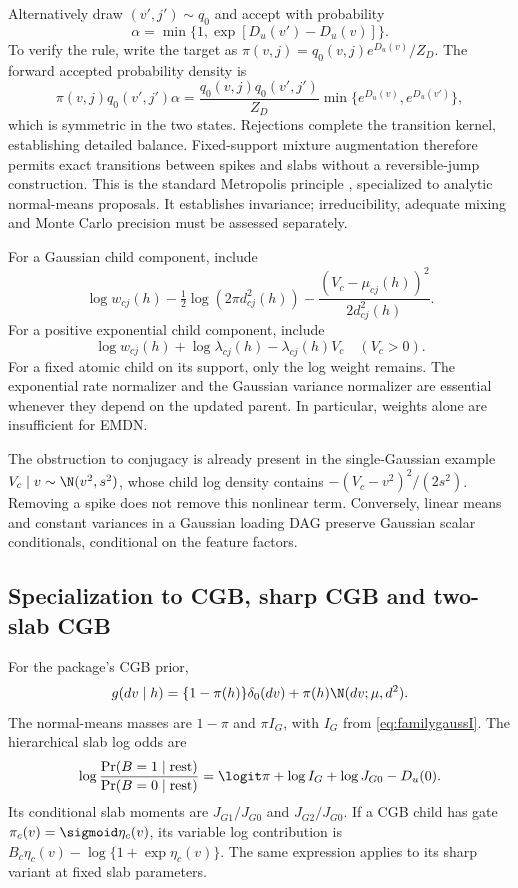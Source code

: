 Alternatively draw \((v',j')\sim q_0\) and accept with probability
\begin{equation}\label{eq:familyMH}
\alpha=\min\{1,\exp[D_u(v')-D_u(v)]\}.
\end{equation}
To verify the rule, write the target as
\(\pi(v,j)=q_0(v,j)e^{D_u(v)}/Z_D\).
The forward accepted probability density is
\[
\pi(v,j)q_0(v',j')\alpha
=\frac{q_0(v,j)q_0(v',j')}{Z_D}
 \min\{e^{D_u(v)},e^{D_u(v')}\},
\]
which is symmetric in the two states. Rejections complete the transition
kernel, establishing detailed balance. Fixed-support mixture augmentation
therefore permits exact transitions between spikes and slabs without a
reversible-jump construction. This is the standard Metropolis principle
\cite{hastings}, specialized to analytic normal-means proposals.
It establishes invariance; irreducibility, adequate mixing and Monte Carlo
precision must be assessed separately.

For a Gaussian child component, include
\[
\log w_{cj}(h)-\tfrac12\log(2\pi d_{cj}^2(h))
-\frac{(V_c-\mu_{cj}(h))^2}{2d_{cj}^2(h)}.
\]
For a positive exponential child component, include
\begin{equation}\label{eq:expchild}
\log w_{cj}(h)+\log\lambda_{cj}(h)-\lambda_{cj}(h)V_c
\quad(V_c>0).
\end{equation}
For a fixed atomic child on its support, only the log weight remains.
The exponential rate normalizer and the Gaussian variance normalizer are
essential whenever they depend on the updated parent. In particular,
weights alone are insufficient for EMDN.

The obstruction to conjugacy is already present in the single-Gaussian
example \(V_c\mid v\sim\N(v^2,s^2)\), whose child log density contains
\(-(V_c-v^2)^2/(2s^2)\). Removing a spike does not remove this nonlinear
term. Conversely, linear means and constant variances in a Gaussian
loading DAG preserve Gaussian scalar conditionals, conditional on the
feature factors.

\subsection{Specialization to CGB, sharp CGB and two-slab CGB}
\label{sec:familycgb}
For the package's CGB prior,
\[
g(dv\mid h)=\{1-\pi(h)\}\delta_0(dv)
                +\pi(h)\N(dv;\mu,d^2).
\]
The normal-means masses are \(1-\pi\) and \(\pi I_G\), with
\(I_G\) from \eqref{eq:familygaussI}. The hierarchical slab log odds are
\begin{equation}\label{eq:cgbfamilyodds}
\log\frac{\Pr(B=1\mid\mathrm{rest})}{\Pr(B=0\mid\mathrm{rest})}
=\logit\pi+\log I_G+\log J_{G0}-D_u(0).
\end{equation}
Its conditional slab moments are \(J_{G1}/J_{G0}\) and
\(J_{G2}/J_{G0}\). If a CGB child has gate
\(\pi_c(v)=\sigmoid\eta_c(v)\), its variable log contribution is
\(B_c\eta_c(v)-\log\{1+\exp\eta_c(v)\}\).
The same expression applies to its sharp variant at fixed slab parameters.

